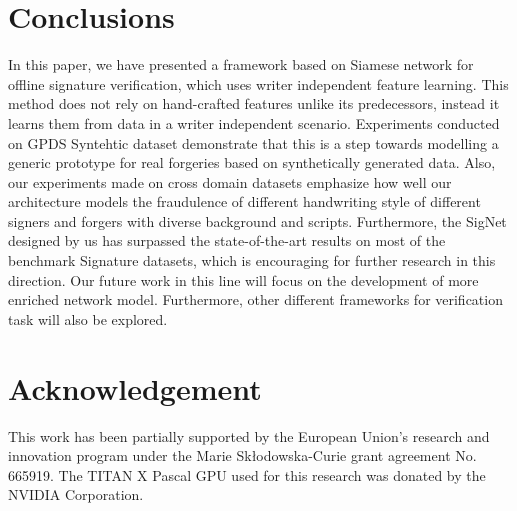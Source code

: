 \documentclass[times,twocolumn,final]{elsarticle}
\begin{document}
\section{Conclusions}
\label{s:concl}
In this paper, we have presented a framework based on Siamese network for offline signature verification, which uses writer independent feature learning. This method does not rely on hand-crafted features unlike its predecessors, instead it learns them from data in a writer independent scenario. Experiments conducted on GPDS Syntehtic dataset demonstrate that this is a step towards modelling a generic prototype for real forgeries based on synthetically generated data. Also, our experiments made on cross domain datasets emphasize how well our architecture models the fraudulence of different handwriting style of different signers and forgers with diverse background and scripts. Furthermore, the SigNet designed by us has surpassed the state-of-the-art results on most of the benchmark Signature datasets, which is encouraging for further research in this direction. Our future work in this line will focus on the development of more enriched network model. Furthermore, other different frameworks for verification task will also be explored.





 
\section*{Acknowledgement}
\label{sec:ack}
This work has been partially supported by the European Union's research and innovation program under the Marie Sk\l{}odowska-Curie grant agreement No. 665919. The TITAN X Pascal GPU used for this research was donated by the NVIDIA Corporation. 


\end{document}
